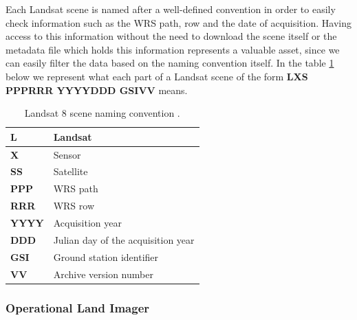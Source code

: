 \documentclass[12pt, a4paper]{report}
\begin{document}
	\par Each Landsat scene is named after a well-defined convention in order to easily check information such as the WRS path, row and the date of acquisition. Having access to this information without the need to download the scene itself or the metadata file which holds this information represents a valuable asset, since we can easily filter the data based on the naming convention itself. In the table \ref{table:landsat_table} below we represent what each part of a Landsat scene of the form \textbf{LXS PPPRRR YYYYDDD GSIVV} means.
	\begin{table} [h]
		\center
		\begin{tabularx}{480pt}{|X|X|}
			\toprule
			\textbf{L} & Landsat \\ [0.2ex]
			\midrule
			\textbf{X} & Sensor \\ [0.2ex]
			\midrule
			\textbf{SS} & Satellite \\ [0.2ex]
			\midrule
			\textbf{PPP} & WRS path \\ [0.2ex]
			\midrule
			\textbf{RRR} & WRS row \\ [0.2ex]
			\midrule
			\textbf{YYYY} & Acquisition year \\ [0.2ex]
			\midrule
			\textbf{DDD} & Julian day of the acquisition year \\ [0.2ex]
			\midrule
			\textbf{GSI} & Ground station identifier \\ [0.2ex]
			\midrule
			\textbf{VV} & Archive version number \\ [0.2ex]
			\midrule
			\midrule
			\bottomrule
		\end{tabularx}
		\caption{Landsat 8 scene naming convention \cite{sn}.}
		\label{table:landsat_table}
	\end{table}
	
	\subsubsection{Operational Land Imager}
	
\end{document}
